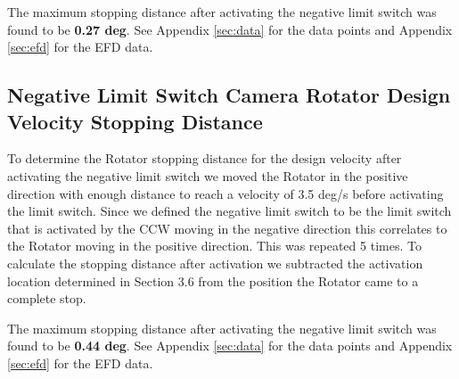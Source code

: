 \documentclass[SE,authoryear,toc]{lsstdoc}
\begin{document}
The maximum stopping distance after activating the negative limit switch
was found to be \textbf{0.27 deg}. See Appendix \ref{sec:data} for the data points
and Appendix \ref{sec:efd} for the EFD data.

\subsection{Negative Limit Switch Camera Rotator Design Velocity Stopping Distance}

To determine the Rotator stopping distance for the design velocity after
activating the negative limit switch we moved the Rotator in the
positive direction with enough distance to reach a velocity of 3.5 deg/s
before activating the limit switch. Since we defined the negative limit
switch to be the limit switch that is activated by the CCW moving in the
negative direction this correlates to the Rotator moving in the positive
direction. This was repeated 5 times. To calculate the stopping
distance after activation we subtracted the activation location
determined in Section 3.6 from the position the Rotator came to a
complete stop.

The maximum stopping distance after activating the negative limit switch
was found to be \textbf{0.44 deg}. See Appendix \ref{sec:data} for the data points
and Appendix \ref{sec:efd} for the EFD data.
\end{document}
